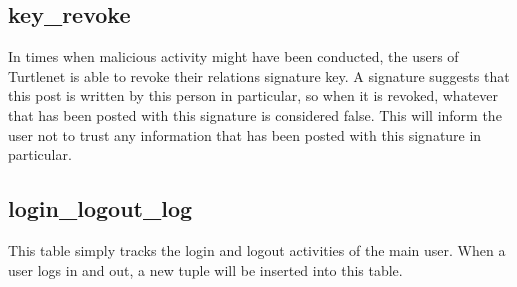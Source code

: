 \subsection{key\_revoke}
In times when malicious activity might have been conducted, the users of Turtlenet is able to revoke their relations signature key. A signature suggests that this post is written by this person in particular, so when it is revoked, whatever that has been posted with this signature is considered false. This will inform the user not to trust any information that has been posted with this signature in particular. 

\subsection{login\_logout\_log}
This table simply tracks the login and logout activities of the main user. When a user logs in and out, a new tuple will be inserted into this table.
